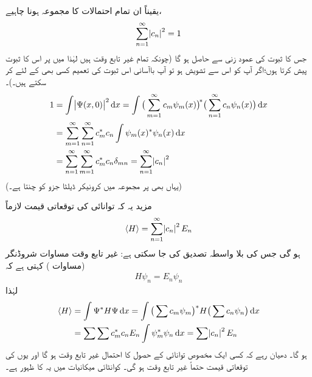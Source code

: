 یقیناً ان تمام احتمالات کا مجموعہ  ہونا چاہیے،
\begin{align}
\sum_{n=1}^{\infty}\abs{c_n}^2=1
\end{align}
جس کا ثبوت  کی عمود زنی سے حاصل ہو گا (چونکہ تمام  غیر تابع وقت ہیں لہٰذا میں  پر اس کا  ثبوت پیش کرتا ہوں؛اگر آپ کو اس سے تشویش ہو تو  آپ باآسانی اس ثبوت کی تعمیم کسی بھی   کے لئے کر سکتے ہیں۔)۔
\begin{align*}
1&=\int\abs{\Psi(x,0)}^2\dif x=\int \big(\sum_{m=1}^{\infty}c_m\psi_m(x)\big)^{\!*}\big(\sum_{n=1}^{\infty}c_n\psi_n(x)\big)\dif x\\
&=\sum_{m=1}^{\infty}\sum_{n=1}^{\infty}c_m^*c_n\int\psi_m(x)^*\psi_n(x)\dif x\\
&=\sum_{n=1}^{\infty}\sum_{m=1}^{\infty}c_m^*c_n\delta_{mn}=\sum_{n=1}^{\infty}\abs{c_n}^2
\end{align*}
(یہاں بھی  پر مجموعہ  میں کرونیکر ڈیلٹا جزو  کو چنتا ہے۔)

مزید یہ کہ  توانائی کی توقعاتی قیمت لازماً 
\begin{align}\label{مساوات_غیر_تابع_وقت_توانائی_توقعاتی_قیمت}
\langle H\rangle=\sum_{n=1}^{\infty} \abs{c_n}^2 E_n
\end{align} 
ہو گی   جس کی بلا واسطہ تصدیق کی جا سکتی ہے: غیر تابع وقت مساوات شروڈنگر (مساوات ) کہتی ہے کہ
\begin{align}
H\psi_n=E_n\psi_n
\end{align}
لہٰذا
\begin{align*}
\langle H \rangle &=\int \Psi^*H\Psi\dif x=\int \big(\sum c_m\psi_m\big)^* H\big(\sum c_n\psi_n\big)\dif x\\
&=\sum\sum c_m^*c_nE_n\int \psi_m^*\psi_n\dif x=\sum\abs{c_n}^2 E_n
\end{align*}
ہو گا۔ دھیان رہے کہ کسی ایک مخصوص توانائی کے حصول کا احتمال غیر تابع وقت ہو گا اور یوں  کی توقعاتی قیمت حتماً  غیر تابع وقت ہو گی۔ کوانٹائی میکانیات میں یہ  کا ظہور ہے۔

